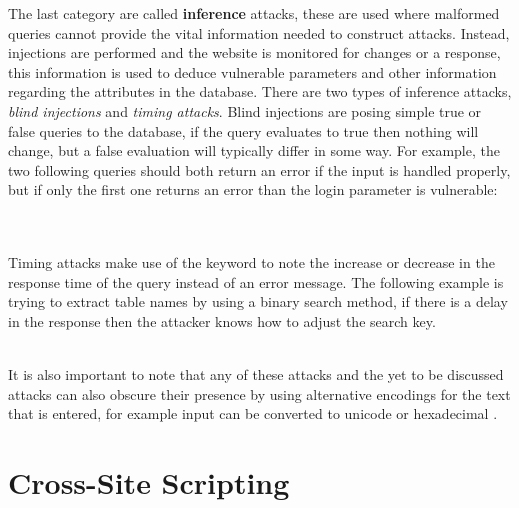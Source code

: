 The last category are called \textbf{inference} attacks, these are used where malformed queries cannot provide the vital information needed to construct attacks.  Instead, injections are performed and the website is monitored for changes or a response, this information is used to deduce vulnerable parameters and other information regarding the attributes in the database.  There are two types of inference attacks, \emph{blind injections} and \emph{timing attacks}. Blind injections are posing simple true or false queries to the database, if the query evaluates to true then nothing will change, but a false evaluation will typically differ in some way.  For example, the two following queries should both return an error if the input is handled properly, but if only the first one returns an error than the login parameter is vulnerable:  

\noindent
{}
\\

\noindent
{}
\\

Timing attacks make use of the  keyword to note the increase or decrease in the response time of the query instead of an error message.  The following example is trying to extract table names by using a binary search method, if there is a delay in the response then the attacker knows how to adjust the search key.

\noindent
{}
\\

It is also important to note that any of these attacks and the yet to be discussed attacks can also obscure their presence by using alternative encodings for the text that is entered, for example input can be converted to unicode or hexadecimal \cite{aClassificationOfSQL}.

\section{Cross-Site Scripting}\label{sec:xssExplanation}

